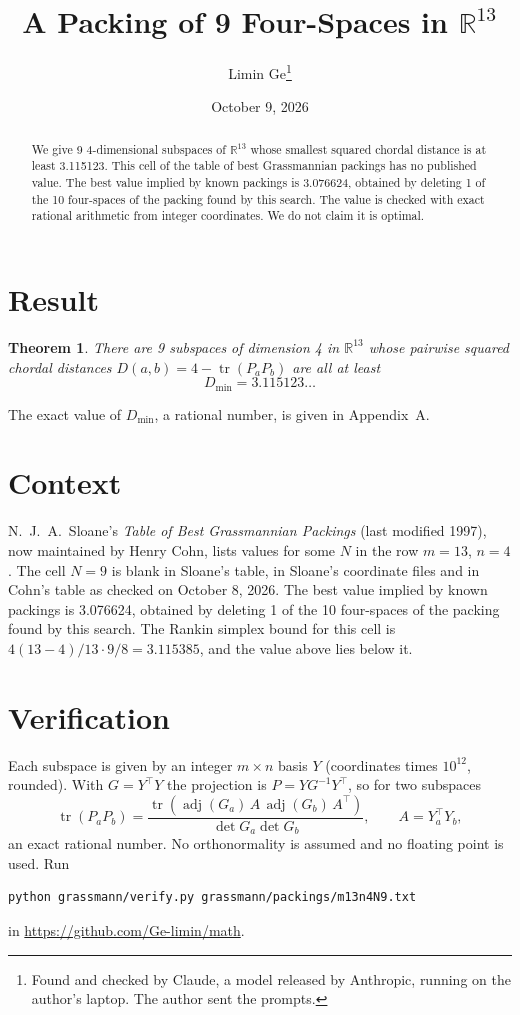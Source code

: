 \documentclass[11pt,a4paper]{article}
\title{A Packing of 9 Four-Spaces in $\mathbb{R}^{13}$}
\author{Limin Ge\thanks{Found and checked by Claude, a model released by Anthropic, running on the author's laptop. The author sent the prompts.}}
\date{October 9, 2026}
\newtheorem*{theorem}{Theorem}
\begin{document}
\maketitle
\begin{abstract}
We give 9 4-dimensional subspaces of $\mathbb{R}^{13}$ whose smallest squared chordal distance is at least 3.115123. This cell of the table of best Grassmannian packings has no published value. The best value implied by known packings is 3.076624, obtained by deleting 1 of the 10 four-spaces of the packing found by this search. The value is checked with exact rational arithmetic from integer coordinates. We do not claim it is optimal.
\end{abstract}

\section{Result}
\begin{theorem}
There are 9 subspaces of dimension 4 in $\mathbb{R}^{13}$ whose pairwise squared chordal distances $D(a,b) = 4 - \operatorname{tr}(P_aP_b)$ are all at least
\[ D_{\min} = 3.115123\ldots \]
\end{theorem}
The exact value of $D_{\min}$, a rational number, is given in Appendix~A.


\section{Context}
N.~J.~A.~Sloane's \emph{Table of Best Grassmannian Packings} (last modified 1997), now maintained by Henry Cohn, lists values for some $N$ in the row $m=13$, $n=4$. The cell $N=9$ is blank in Sloane's table, in Sloane's coordinate files and in Cohn's table as checked on October 8, 2026. The best value implied by known packings is 3.076624, obtained by deleting 1 of the 10 four-spaces of the packing found by this search. The Rankin simplex bound for this cell is $4(13-4)/13\cdot 9/8 = 3.115385$, and the value above lies below it.


\section{Verification}
Each subspace is given by an integer $m\times n$ basis $Y$ (coordinates times $10^{12}$, rounded). With $G=Y^\top Y$ the projection is $P=YG^{-1}Y^\top$, so for two subspaces
\[ \operatorname{tr}(P_aP_b)=\frac{\operatorname{tr}(\operatorname{adj}(G_a)\,A\,\operatorname{adj}(G_b)\,A^\top)}{\det G_a\det G_b},\qquad A=Y_a^\top Y_b, \]
an exact rational number. No orthonormality is assumed and no floating point is used. Run
\begin{verbatim}
python grassmann/verify.py grassmann/packings/m13n4N9.txt
\end{verbatim}
in \url{https://github.com/Ge-limin/math}.
\end{document}
